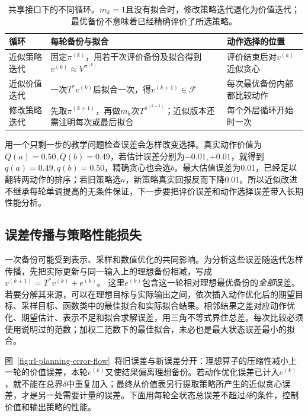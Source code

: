 \begin{table}[htbp]
 \centering
 \small
 \begin{tabularx}{\linewidth}{@{}l>{\raggedright\arraybackslash}X>{\raggedright\arraybackslash}X@{}}
  \toprule
  循环 & 每轮备份与拟合 & 动作选择的位置\\
  \midrule
  近似策略迭代 & 固定$\pi^{(k)}$，用若干次评价备份及拟合得到$v^{(k)}\approx V^{\pi^{(k)}}$ & 评价结束后对$v^{(k)}$近似贪心\\
  近似价值迭代 & 一次$T^*v^{(k)}$后拟合一次，得$v^{(k+1)}\in\mathcal F$ & 每次最优备份内部都比较动作\\
  修改策略迭代 & 先取$\pi^{(k+1)}$，再做$m_k$次$T^{\pi^{(k+1)}}$；近似版本还需注明每次或最后拟合 & 每个外层循环开始时一次\\
  \bottomrule
 \end{tabularx}
 \caption{共享接口下的不同循环。$m_k=1$且没有拟合时，修改策略迭代退化为价值迭代；最优备份不意味着已经精确评价了所选策略。}
 \label{tab:rl-planning-approximate-loops}
\end{table}

用一个只剩一步的教学问题检查误差会怎样改变选择。真实动作价值为$Q(a)=0.50,Q(b)=0.49$，若估计误差分别为$-0.01,+0.01$，就得到$q(a)=0.49,q(b)=0.50$，精确贪心也会选$b$。最大估值误差为$0.01$，已经足以翻转两动作的排序；若旧策略选$a$，新策略真实回报反而下降$0.01$。所以近似改进不继承每轮单调提高的无条件保证，下一步要把评价误差和动作选择误差带入长期性能分析。

\subsection{误差传播与策略性能损失}
\label{sec:rl-planning-error-propagation}

一次备份可能受到表示、采样和数值优化的共同影响。为分析这些误差随迭代怎样传播，先把实际更新与同一输入上的理想备份相减，写成
$v^{(k+1)}=T^*v^{(k)}+e^{(k)}$。
这里$e^{(k)}$包含这一轮相对理想最优备份的\emph{全部}误差。若要分解其来源，可以在理想目标与实际输出之间，依次插入动作优化后的期望目标、采样目标、函数类中的最佳拟合和实际拟合结果。相邻结果之差对应动作优化、期望估计、表示不足和拟合求解误差，用三角不等式界住总差。每次比较必须使用说明过的范数；加权二范数下的最佳拟合，未必也是最大状态误差最小的拟合。

图~\ref{fig:rl-planning-error-flow}~将旧误差与新误差分开：理想算子的压缩性减小上一轮的价值误差，本轮$e^{(k)}$又使结果偏离理想备份。若动作优化误差已计入$e^{(k)}$，就不能在总界$\delta$中重复加入；最终从价值表另行提取策略所产生的近似贪心误差，才是另一处需要计量的误差。下面用每轮全状态总误差不超过$\delta$的条件，控制价值和输出策略的性能。

